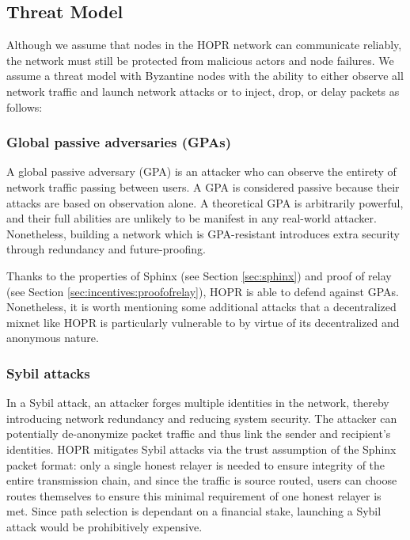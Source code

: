 \subsection{Threat Model}

Although we assume that nodes in the HOPR network can communicate reliably, the network must still be protected from malicious actors and node failures. We assume a threat model with Byzantine nodes with the ability to either observe all network traffic and launch network attacks or to inject, drop, or delay packets as follows:

\subsubsection{Global passive adversaries (GPAs)} A global passive adversary (GPA) is an attacker who can observe the entirety of network traffic passing between users. A GPA is considered passive because their attacks are based on observation alone. A theoretical GPA is arbitrarily powerful, and their full abilities are unlikely to be manifest in any real-world attacker. Nonetheless, building a network which is GPA-resistant introduces extra security through redundancy and future-proofing.

Thanks to the properties of Sphinx (see Section \ref{sec:sphinx}) and proof of relay (see Section \ref{sec:incentives:proofofrelay}), HOPR is able to defend against GPAs. Nonetheless, it is worth mentioning some additional attacks that a decentralized mixnet like HOPR is particularly vulnerable to by virtue of its decentralized and anonymous nature.

\subsubsection{Sybil attacks}
In a Sybil attack, an attacker forges multiple identities in the network, thereby introducing network redundancy and reducing system security. The attacker can potentially de-anonymize packet traffic and thus link the sender and recipient's identities. HOPR mitigates Sybil attacks via the trust assumption of the Sphinx packet format: only a single honest relayer is needed to ensure integrity of the entire transmission chain, and since the traffic is source routed, users can choose routes themselves to ensure this minimal requirement of one honest relayer is met. Since path selection is dependant on a financial stake, launching a Sybil attack would be prohibitively expensive.

